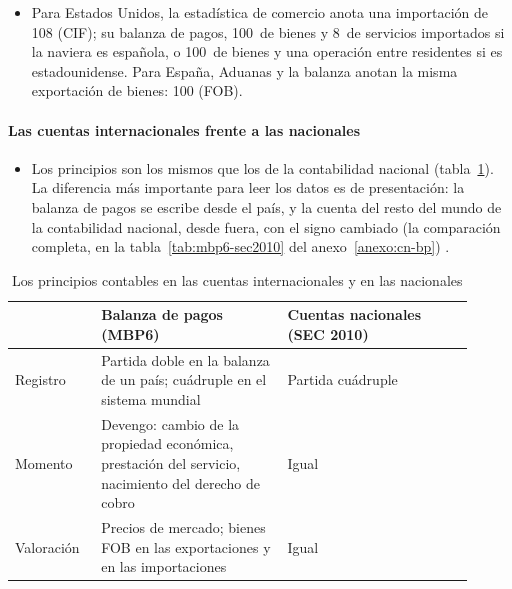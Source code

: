 \documentclass[11pt]{article}
\begin{document}
\begin{itemize}
\item Para Estados Unidos, la estadística de comercio anota una importación de 108 (CIF); su balanza de pagos, 100~de bienes y 8~de servicios importados si la naviera es española, o 100~de bienes y una operación entre residentes si es estadounidense. Para España, Aduanas y la balanza anotan la misma exportación de bienes: 100 (FOB).
\end{itemize}

\paragraph{Las cuentas internacionales frente a las nacionales}
\begin{itemize}
\item Los principios son los mismos que los de la contabilidad nacional (tabla~\ref{tab:principios-sec2010}). La diferencia más importante para leer los datos es de presentación: la balanza de pagos se escribe desde el país, y la cuenta del resto del mundo de la contabilidad nacional, desde fuera, con el signo cambiado (la comparación completa, en la tabla~\ref{tab:mbp6-sec2010} del anexo~\ref{anexo:cn-bp}) .
\end{itemize}

\begin{table}[H]
\centering
\caption{Los principios contables en las cuentas internacionales y en las nacionales}\label{tab:principios-sec2010}
\renewcommand{\arraystretch}{1.25}
\small
\begin{tabular}{>{\raggedright\arraybackslash}m{0.17\linewidth}>{\raggedright\arraybackslash}m{0.37\linewidth}>{\raggedright\arraybackslash}m{0.37\linewidth}}
\toprule
\rowcolor{tceeazulpalido}
 & \textbf{Balanza de pagos (MBP6)} & \textbf{Cuentas nacionales (SEC 2010)}\\
\midrule
Registro & Partida doble en la balanza de un país; cuádruple en el sistema mundial & Partida cuádruple\\
Momento & Devengo: cambio de la propiedad económica, prestación del servicio, nacimiento del derecho de cobro & Igual\\
Valoración & Precios de mercado; bienes FOB en las exportaciones y en las importaciones & Igual\\
\bottomrule
\end{tabular}
\end{table}
\end{document}
